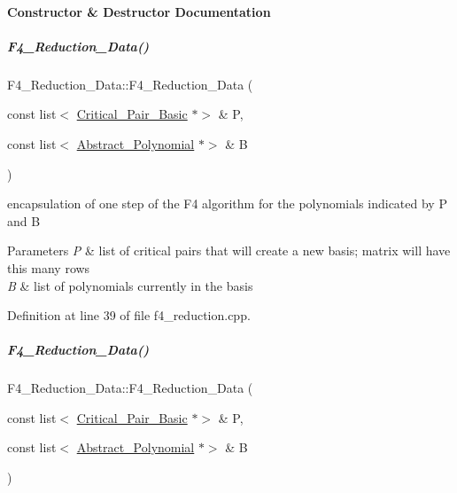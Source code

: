 \paragraph{Constructor \& Destructor Documentation}
\mbox{\label{group___g_b_computation_ada9c61c0f75be4a2b3dd5c762c1c9a1b}} 
\subparagraph{\texorpdfstring{F4\+\_\+\+Reduction\+\_\+\+Data()}{F4\_Reduction\_Data()}\hspace{0.1cm}{\footnotesize\ttfamily [1/2]}}
{\footnotesize\ttfamily F4\+\_\+\+Reduction\+\_\+\+Data\+::\+F4\+\_\+\+Reduction\+\_\+\+Data (\begin{DoxyParamCaption}\item[{const list$<$ \hyperlink{group___g_b_computation_class_critical___pair___basic}{Critical\+\_\+\+Pair\+\_\+\+Basic} $\ast$$>$ \&}]{P,  }\item[{const list$<$ \hyperlink{group__polygroup_class_abstract___polynomial}{Abstract\+\_\+\+Polynomial} $\ast$$>$ \&}]{B }\end{DoxyParamCaption})}



encapsulation of one step of the F4 algorithm for the polynomials indicated by {\ttfamily P} and {\ttfamily B} 


\begin{DoxyParams}{Parameters}
{\em P} & list of critical pairs that will create a new basis; matrix will have this many rows \\
\hline
{\em B} & list of polynomials currently in the basis \\
\hline
\end{DoxyParams}


Definition at line 39 of file f4\+\_\+reduction.\+cpp.

\mbox{\label{group___g_b_computation_ada9c61c0f75be4a2b3dd5c762c1c9a1b}} 
\subparagraph{\texorpdfstring{F4\+\_\+\+Reduction\+\_\+\+Data()}{F4\_Reduction\_Data()}\hspace{0.1cm}{\footnotesize\ttfamily [2/2]}}
{\footnotesize\ttfamily F4\+\_\+\+Reduction\+\_\+\+Data\+::\+F4\+\_\+\+Reduction\+\_\+\+Data (\begin{DoxyParamCaption}\item[{const list$<$ \hyperlink{group___g_b_computation_class_critical___pair___basic}{Critical\+\_\+\+Pair\+\_\+\+Basic} $\ast$$>$ \&}]{P,  }\item[{const list$<$ \hyperlink{group__polygroup_class_abstract___polynomial}{Abstract\+\_\+\+Polynomial} $\ast$$>$ \&}]{B }\end{DoxyParamCaption})}



